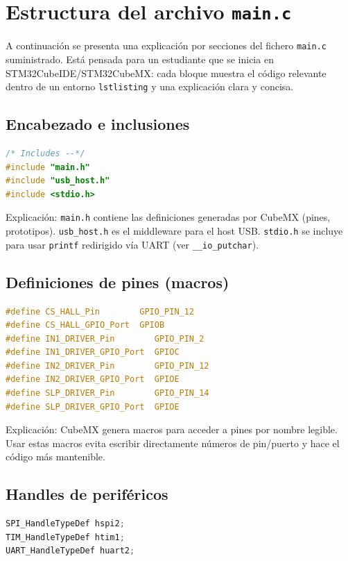 \documentclass[a4paper,12pt]{article}
\begin{document}
\section{Estructura del archivo \texttt{main.c}}

A continuación se presenta una explicación por secciones del fichero \texttt{main.c} suministrado. Está pensada para un estudiante que se inicia en STM32CubeIDE/STM32CubeMX: cada bloque muestra el código relevante dentro de un entorno \texttt{lstlisting} y una explicación clara y concisa.

\subsection{Encabezado e inclusiones}
\begin{lstlisting}[language=C]
/* Includes --*/
#include "main.h"
#include "usb_host.h"
#include <stdio.h>
\end{lstlisting}

Explicación: \texttt{main.h} contiene las definiciones generadas por CubeMX (pines, prototipos). \texttt{usb\_host.h} es el middleware para el host USB. \texttt{stdio.h} se incluye para usar \texttt{printf} redirigido vía UART (ver \texttt{\_\_io\_putchar}).

\subsection{Definiciones de pines (macros)}
\begin{lstlisting}[language=C]
#define CS_HALL_Pin        GPIO_PIN_12
#define CS_HALL_GPIO_Port  GPIOB
#define IN1_DRIVER_Pin        GPIO_PIN_2
#define IN1_DRIVER_GPIO_Port  GPIOC
#define IN2_DRIVER_Pin        GPIO_PIN_12
#define IN2_DRIVER_GPIO_Port  GPIOE
#define SLP_DRIVER_Pin        GPIO_PIN_14
#define SLP_DRIVER_GPIO_Port  GPIOE
\end{lstlisting}

Explicación: CubeMX genera macros para acceder a pines por nombre legible. Usar estas macros evita escribir directamente números de pin/puerto y hace el código más mantenible.

\subsection{Handles de periféricos}
\begin{lstlisting}[language=C]
SPI_HandleTypeDef hspi2;
TIM_HandleTypeDef htim1;
UART_HandleTypeDef huart2;
\end{lstlisting}
\end{document}
